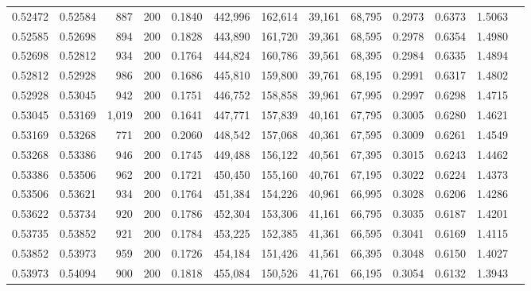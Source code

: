 \begin{tabular}{rrrrrrrrrrrrr}
0.52472 & 0.52584 &    887 & 200 &                                     0.1840 & 442,996 & 162,614 &  39,161 &  68,795 & 0.2973 & 0.6373 & 1.5063 \\
0.52585 & 0.52698 &    894 & 200 &                                     0.1828 & 443,890 & 161,720 &  39,361 &  68,595 & 0.2978 & 0.6354 & 1.4980 \\
0.52698 & 0.52812 &    934 & 200 &                                     0.1764 & 444,824 & 160,786 &  39,561 &  68,395 & 0.2984 & 0.6335 & 1.4894 \\
0.52812 & 0.52928 &    986 & 200 &                                     0.1686 & 445,810 & 159,800 &  39,761 &  68,195 & 0.2991 & 0.6317 & 1.4802 \\
0.52928 & 0.53045 &    942 & 200 &                                     0.1751 & 446,752 & 158,858 &  39,961 &  67,995 & 0.2997 & 0.6298 & 1.4715 \\
0.53045 & 0.53169 &  1,019 & 200 &                                     0.1641 & 447,771 & 157,839 &  40,161 &  67,795 & 0.3005 & 0.6280 & 1.4621 \\
0.53169 & 0.53268 &    771 & 200 &                                     0.2060 & 448,542 & 157,068 &  40,361 &  67,595 & 0.3009 & 0.6261 & 1.4549 \\
0.53268 & 0.53386 &    946 & 200 &                                     0.1745 & 449,488 & 156,122 &  40,561 &  67,395 & 0.3015 & 0.6243 & 1.4462 \\
0.53386 & 0.53506 &    962 & 200 &                                     0.1721 & 450,450 & 155,160 &  40,761 &  67,195 & 0.3022 & 0.6224 & 1.4373 \\
0.53506 & 0.53621 &    934 & 200 &                                     0.1764 & 451,384 & 154,226 &  40,961 &  66,995 & 0.3028 & 0.6206 & 1.4286 \\
0.53622 & 0.53734 &    920 & 200 &                                     0.1786 & 452,304 & 153,306 &  41,161 &  66,795 & 0.3035 & 0.6187 & 1.4201 \\
0.53735 & 0.53852 &    921 & 200 &                                     0.1784 & 453,225 & 152,385 &  41,361 &  66,595 & 0.3041 & 0.6169 & 1.4115 \\
0.53852 & 0.53973 &    959 & 200 &                                     0.1726 & 454,184 & 151,426 &  41,561 &  66,395 & 0.3048 & 0.6150 & 1.4027 \\
0.53973 & 0.54094 &    900 & 200 &                                     0.1818 & 455,084 & 150,526 &  41,761 &  66,195 & 0.3054 & 0.6132 & 1.3943 \\

\end{tabular}

